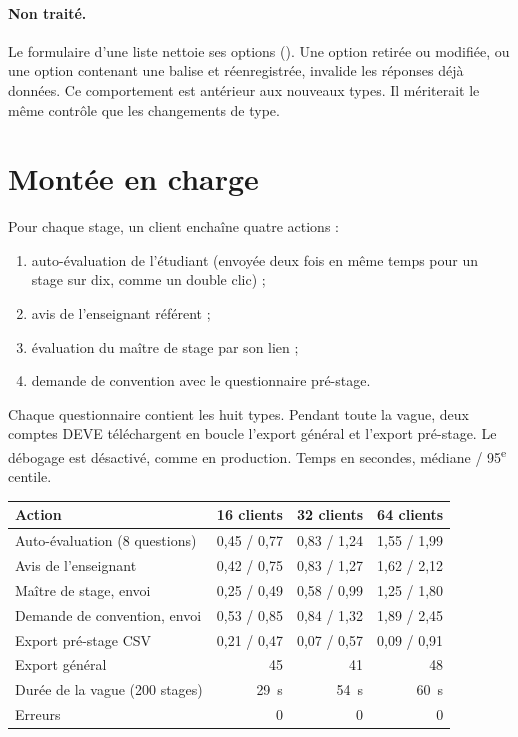 \documentclass[11pt,a4paper]{article}
\begin{document}
\paragraph{Non traité.} Le formulaire d'une liste nettoie ses options (). Une
option retirée ou modifiée, ou une option contenant une balise et réenregistrée, invalide les
réponses déjà données. Ce comportement est antérieur aux nouveaux types. Il mériterait le même
contrôle que les changements de type.

\section{Montée en charge}

Pour chaque stage, un client enchaîne quatre actions :
\begin{enumerate}
  \item auto-évaluation de l'étudiant (envoyée deux fois en même temps pour un stage sur dix,
    comme un double clic) ;
  \item avis de l'enseignant référent ;
  \item évaluation du maître de stage par son lien ;
  \item demande de convention avec le questionnaire pré-stage.
\end{enumerate}
Chaque questionnaire contient les huit types. Pendant toute la vague, deux comptes DEVE
téléchargent en boucle l'export général et l'export pré-stage. Le débogage est désactivé, comme en
production. Temps en secondes, médiane / 95\textsuperscript{e} centile.

\begin{center}
\small
\begin{tabular}{@{}l r r r@{}}
\toprule
\textbf{Action} & \textbf{16 clients} & \textbf{32 clients} & \textbf{64 clients} \\
\midrule
Auto-évaluation (8 questions) & 0,45 / 0,77 & 0,83 / 1,24 & 1,55 / 1,99 \\
Avis de l'enseignant & 0,42 / 0,75 & 0,83 / 1,27 & 1,62 / 2,12 \\
Maître de stage, envoi & 0,25 / 0,49 & 0,58 / 0,99 & 1,25 / 1,80 \\
Demande de convention, envoi & 0,53 / 0,85 & 0,84 / 1,32 & 1,89 / 2,45 \\
Export pré-stage CSV & 0,21 / 0,47 & 0,07 / 0,57 & 0,09 / 0,91 \\
Export général & 45 & 41 & 48 \\
\midrule
Durée de la vague (200 stages) & 29~s & 54~s & 60~s \\
Erreurs & 0 & 0 & 0 \\
\bottomrule
\end{tabular}
\end{center}
\end{document}
